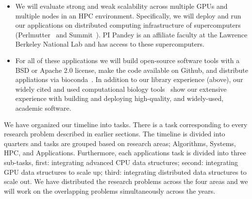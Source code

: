 \begin{itemize}
  \item We will evaluate strong and weak scalability across multiple GPUs and multiple nodes in an HPC environment. Specifically, we will deploy and run our applications on distributed computing infrastructure of supercomputers (Perlmutter~\cite{perlmutter} and Summit~\cite{summit}). PI Pandey is an affiliate faculty at the Lawrence Berkeley National Lab and has access to these supercomputers.
  \item For all of these applications we will build open-source software tools with a BSD or Apache 2.0 license, make the code available on Github, and distribute appliations via bioconda~\cite{Gr_ning_2018}. In addition to our library experience (above), our widely cited and used computational biology tools~\cite{PandeyAlBe18,PandeyBJP17,PandeyBeJo17b,PandeyBeJo18,pandey2020timely,pandey2021variantstore,pandey2021terrace,PandeyBeCo23,Patro2017Salmon,he2022alevin,He2023,Khan2022} show our extensive experience with building and deploying high-quality, and widely-used, academic software.
\end{itemize}

%

We have organized our timeline into tasks. There is a task corresponding to every research problem described in earlier sections. The timeline is divided into quarters and tasks are grouped based on research areas; Algorithms, Systems, HPC, and Applications. Furthermore, each applications task is divided into three sub-tasks, first: integrating advanced CPU data structures; second: integrating GPU data structures to scale up; third: integrating distributed data structures to scale out.
%
We have distributed the research problems across the four areas and we will work on the overlapping problems simultaneously across the years.




